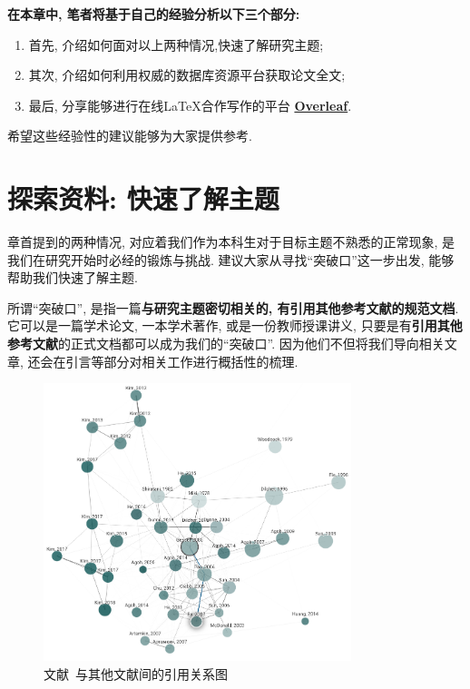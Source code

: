 \documentclass{formatBook}
\begin{document}
\textbf{在本章中, 笔者将基于自己的经验分析以下三个部分:}
\begin{enumerate}
    \item 首先, 介绍如何面对以上两种情况,快速了解研究主题;
    \item 其次, 介绍如何利用权威的数据库资源平台获取论文全文;
    \item 最后, 分享能够进行在线\LaTeX 合作写作的平台 \textbf{\href{https://www.overleaf.com/}{Overleaf}}.
\end{enumerate}

希望这些经验性的建议能够为大家提供参考.

\section{探索资料: 快速了解主题}
章首提到的两种情况, 对应着我们作为本科生对于目标主题不熟悉的正常现象, 是我们在研究开始时必经的锻炼与挑战. 建议大家从寻找``突破口''这一步出发, 能够帮助我们快速了解主题.

所谓``突破口'', 是指一篇\textbf{与研究主题密切相关的, 有引用其他参考文献的规范文档}. 它可以是一篇学术论文, 一本学术著作, 或是一份教师授课讲义, 只要是有\textbf{引用其他参考文献}的正式文档都可以成为我们的``突破口''. 因为他们不但将我们导向相关文章, 还会在引言等部分对相关工作进行概括性的梳理.

\begin{figure}[H]
    \centering
    \includegraphics[width=0.8\textwidth]{figure/graph.png}
    \caption{文献~\cite{GesselMiki2005}与其他文献间的引用关系图}
    \label{fig:mikiGrapg}
\end{figure}
\end{document}
